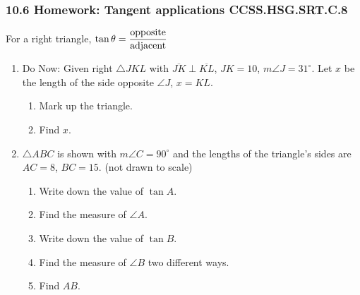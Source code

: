 \documentclass[12pt, twoside]{article}
\begin{document}
\subsubsection*{10.6 Homework: Tangent applications \hfill CCSS.HSG.SRT.C.8}
For a right triangle, $\displaystyle \tan \theta = \frac{\rm{opposite}}{\rm{adjacent}}$
\begin{enumerate}
\item Do Now: Given right $\triangle JKL$ with $\overline{JK} \perp \overline{KL}$, $JK=10$, $m\angle J=31^\circ$. Let $x$ be the length of the side opposite $\angle J$, $x=KL$.
\begin{enumerate}
  \item Mark up the triangle.
  \item Find $x$.
\end{enumerate}
    \begin{flushright}
      \end{flushright}

\item $\triangle ABC$ is shown with $m\angle C=90^\circ$ and the lengths of the triangle's sides are $AC=8$, $BC=15$.  \hfill (not drawn to scale)
  \begin{multicols}{2}
    \begin{enumerate}
      \item Write down the value of $\tan A$. \vspace{1.25cm}
      \item Find the measure of $\angle A$. \vspace{1cm}
      \item Write down the value of $\tan B$. \vspace{1.25cm}
      \item Find the measure of $\angle B$ two different ways. \vspace{1cm}
      \item Find $AB$.
    \end{enumerate}
    \begin{flushright}
    \end{flushright}
  \end{multicols}
  \vspace{3cm}


\end{enumerate}
\end{document}
